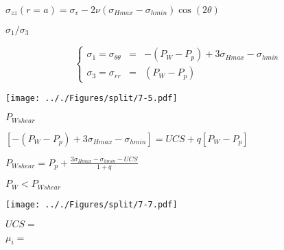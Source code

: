 \documentclass[onecolumn,11pt]{report}
\def\lthtmlcheckvsize{\ifdim\ht\sizebox<\vsize 
  \ifdim\wd\sizebox<\hsize\expandafter\hfill\fi \expandafter\vfill
  \else\expandafter\vss\fi}%
\begin{document}
{\newpage\clearpage
{}%
$\displaystyle \sigma_{zz} (r=a) =  \sigma_v - 2\nu (\sigma_{Hmax}-\sigma_{hmin}) \cos (2\theta)$%
\lthtmlindisplaymathZ
\lthtmlcheckvsize\clearpage}

{\newpage\clearpage
{}%
$ \sigma_1/\sigma_3$%
\lthtmlindisplaymathZ
\lthtmlcheckvsize\clearpage}

{\newpage\clearpage
{}%
\begin{displaymath}\left\lbrace
\begin{array}{rcl}
\sigma_1 = \sigma_{\theta \theta} & = &
-(P_W - P_p) +3\sigma_{Hmax} -\sigma_{hmin} \\
\sigma_3 = \sigma_{rr} & = & (P_W - P_p)
\end{array}
\right.\end{displaymath}%
\lthtmldisplayZ
\lthtmlcheckvsize\clearpage}

{\newpage\clearpage
{}%
\texttt{[image: .././Figures/split/7-5.pdf]}%
\lthtmlpictureZ
\lthtmlcheckvsize\clearpage}

{\newpage\clearpage
{}%
$ P_{Wshear}$%
\lthtmlindisplaymathZ
\lthtmlcheckvsize\clearpage}

{\newpage\clearpage
{}%
$\displaystyle \left[
-(P_W - P_p) +3\sigma_{Hmax} -\sigma_{hmin}
\right] = UCS + q \left[ P_W - P_p \right]$%
\lthtmlindisplaymathZ
\lthtmlcheckvsize\clearpage}

{\newpage\clearpage
{}%
$\displaystyle P_{Wshear} = P_p + \frac{3\sigma_{Hmax} -\sigma_{hmin}
- UCS}{1+q}$%
\lthtmlindisplaymathZ
\lthtmlcheckvsize\clearpage}

{\newpage\clearpage
{}%
$ P_W < P_{Wshear}$%
\lthtmlindisplaymathZ
\lthtmlcheckvsize\clearpage}

{\newpage\clearpage
{}%
\texttt{[image: .././Figures/split/7-7.pdf]}%
\lthtmlpictureZ
\lthtmlcheckvsize\clearpage}

{\newpage\clearpage
{}%
$ UCS =$%
\lthtmlindisplaymathZ
\lthtmlcheckvsize\clearpage}

{\newpage\clearpage
{}%
$ \mu_i=$%
\lthtmlindisplaymathZ
\lthtmlcheckvsize\clearpage}
\end{document}
